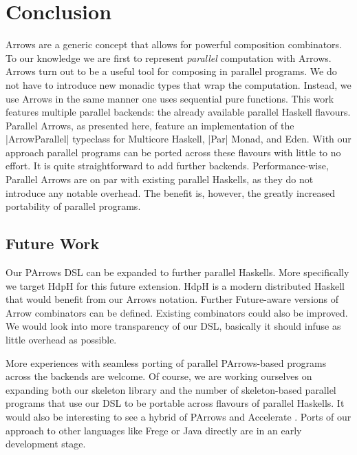 
\section{Conclusion}
\label{sec:conclusion}
Arrows are a generic concept that allows for powerful composition
combinators. To our knowledge we are first to represent
\emph{parallel} computation with Arrows.
%
Arrows turn out to be a useful tool for composing in parallel
programs. We do not have to introduce new monadic types that wrap the
computation. Instead, we use Arrows in the same manner one uses sequential pure functions. 
%
This work features multiple parallel backends: the already available parallel Haskell flavours. Parallel Arrows, as presented here, feature an implementation of the |ArrowParallel| typeclass for Multicore Haskell, |Par| Monad, and Eden. With our approach parallel programs can be ported across these flavours with little to no effort. It is quite straightforward to add further backends. 
%
%
Performance-wise, Parallel Arrows are on par with existing parallel Haskells, as they do not introduce any notable overhead.
%
The benefit is, however, the greatly increased portability of parallel programs.



\subsection{Future Work}
\label{sec:future-work}

Our PArrows DSL can be expanded to further parallel Haskells. More specifically we target HdpH \cite{Maier:2014:HDS:2775050.2633363} for this future extension. HdpH is a modern distributed Haskell that would benefit from our Arrows notation. Further Future-aware versions of Arrow combinators can be defined. Existing combinators could also be improved. We would look into more transparency of our DSL,  basically it should infuse as little overhead as possible.

More experiences with seamless porting of parallel PArrows-based programs across the backends are welcome.
Of course, we are working ourselves on expanding both our skeleton library and the number of skeleton-based parallel programs that use our DSL to be portable across flavours of parallel Haskells.
It would also be interesting to see a hybrid of PArrows and Accelerate \cite{McDonell:2015:TRC:2887747.2804313}.
Ports of our approach to other languages like Frege or Java directly are in an early development stage.
